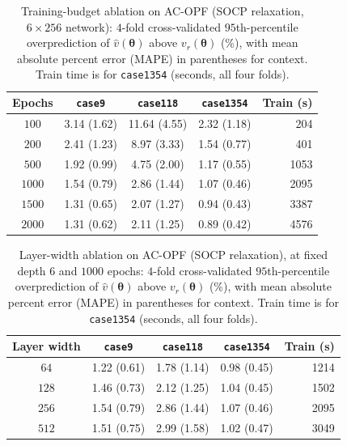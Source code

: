 \documentclass[10pt]{article} %
\theoremstyle{plain}
\theoremstyle{definition}
\theoremstyle{remark}
\begin{document}
\begin{table}[h]
\centering\footnotesize
\caption{Training-budget ablation on AC-OPF (SOCP relaxation, $6\times256$ network): $4$-fold cross-validated $95$th-percentile overprediction of $\hat{v}(\bm{\theta})$ above $v_r(\bm{\theta})$ (\%), with mean absolute percent error (MAPE) in parentheses for context. Train time is for \texttt{case1354} (seconds, all four folds).}
\label{tab:ablation-epochs}
\begin{tabular}{c ccc r}
\toprule
\textbf{Epochs} & \texttt{case9} & \texttt{case118} & \texttt{case1354} & \textbf{Train (s)} \\
\midrule
  $100$ & 3.14 (1.62) & 11.64 (4.55) & 2.32 (1.18) & 204 \\
  $200$ & 2.41 (1.23) & 8.97 (3.33) & 1.54 (0.77) & 401 \\
  $500$ & 1.92 (0.99) & 4.75 (2.00) & 1.17 (0.55) & 1053 \\
  $1000$ & 1.54 (0.79) & 2.86 (1.44) & 1.07 (0.46) & 2095 \\
  $1500$ & 1.31 (0.65) & 2.07 (1.27) & 0.94 (0.43) & 3387 \\
  $2000$ & 1.31 (0.62) & 2.11 (1.25) & 0.89 (0.42) & 4576 \\
\bottomrule
\end{tabular}
\end{table}

\begin{table}[h]
\centering\footnotesize
\caption{Layer-width ablation on AC-OPF (SOCP relaxation), at fixed depth $6$ and $1000$ epochs: $4$-fold cross-validated $95$th-percentile overprediction of $\hat{v}(\bm{\theta})$ above $v_r(\bm{\theta})$ (\%), with mean absolute percent error (MAPE) in parentheses for context. Train time is for \texttt{case1354} (seconds, all four folds).}
\label{tab:ablation-width}
\begin{tabular}{c ccc r}
\toprule
\textbf{Layer width} & \texttt{case9} & \texttt{case118} & \texttt{case1354} & \textbf{Train (s)} \\
\midrule
  $64$ & 1.22 (0.61) & 1.78 (1.14) & 0.98 (0.45) & 1214 \\
  $128$ & 1.46 (0.73) & 2.12 (1.25) & 1.04 (0.45) & 1502 \\
  $256$ & 1.54 (0.79) & 2.86 (1.44) & 1.07 (0.46) & 2095 \\
  $512$ & 1.51 (0.75) & 2.99 (1.58) & 1.02 (0.47) & 3049 \\
\bottomrule
\end{tabular}
\end{table}
\end{document}
